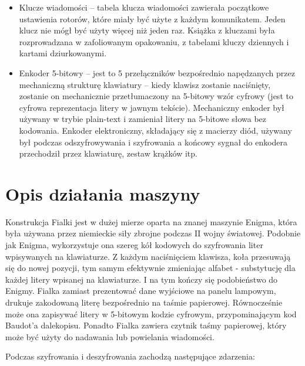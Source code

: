 \documentclass{article}
\begin{document}
\begin{itemize}
\item Klucze wiadomości – tabela klucza wiadomości zawierała początkowe ustawienia rotorów, które miały być użyte z każdym komunikatem. Jeden klucz nie mógł być użyty więcej niż jeden raz. Książka z kluczami była rozprowadzana w zafoliowanym opakowaniu, z tabelami kluczy dziennych i kartami dziurkowanymi.
\item Enkoder 5-bitowy – jest to 5 przełączników bezpośrednio napędzanych przez mechaniczną strukturę klawiatury – kiedy klawisz zostanie naciśnięty, zostanie on mechanicznie przetłumaczony na 5-bitowy wzór cyfrowy (jest to cyfrowa reprezentacja litery w jawnym tekście). Mechaniczny enkoder był używany w trybie plain-text i zamieniał litery na 5-bitowe słowa bez kodowania. Enkoder elektroniczny, składający się z macierzy diód, używany był podczas odszyfrowywania i szyfrowania a końcowy sygnał do enkodera przechodził przez klawiaturę, zestaw krążków itp.
\end{itemize}

\section{Opis działania maszyny}
Konstrukcja Fialki jest w dużej mierze oparta na znanej maszynie Enigma, która była używana przez niemieckie siły zbrojne podczas II wojny światowej. Podobnie jak Enigma, wykorzystuje ona szereg kół kodowych do szyfrowania liter wpisywanych na klawiaturze. Z każdym naciśnięciem klawisza, koła przesuwają się do nowej pozycji, tym samym efektywnie zmieniając alfabet - substytucję dla każdej litery wpisanej na klawiaturze. I na tym kończy się podobieństwo do Enigmy. Fialka zamiast prezentować dane wyjściowe na panelu lampowym, drukuje zakodowaną literę bezpośrednio na taśmie papierowej. Równocześnie może ona zapisywać litery w 5-bitowym kodzie cyfrowym, przypominającym kod Baudot’a dalekopisu. Ponadto Fialka zawiera czytnik taśmy papierowej, który może być użyty do nadawania lub powielania wiadomości. 

Podczas szyfrowania i deszyfrowania zachodzą następujące zdarzenia: 
\end{document}
